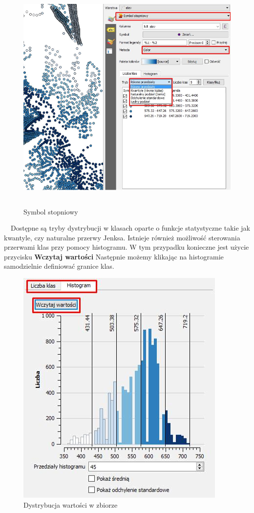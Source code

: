 \documentclass[12pt,a4paper]{book}
\begin{document}
\begin{center}
\begin{figure}
\includegraphics[width=13cm,height=11.666cm]{007-wektor-stopniowy.png}
\caption{Symbol stopniowy}
\end{figure}
\end{center}
\ \ Dostępne są tryby dystrybucji w klasach oparte o funkcje statystyczne takie jak kwantyle, czy naturalne przerwy Jenksa. Istnieje również możliwość sterowania przerwami klas przy pomocy histogramu. W tym przypadku konieczne jest użycie przycisku \textbf{Wczytaj wartości} Następnie możemy klikając na histogramie samodzielnie definiować granice klas.

\begin{center}
\begin{figure}
\includegraphics[width=10.372cm,height=11.903cm]{007-histogram.png}
\caption{Dystrybucja wartości w zbiorze}
\end{figure}
\end{center}
\end{document}
